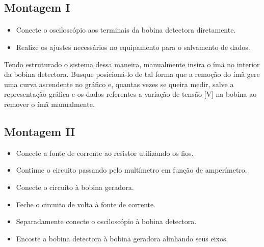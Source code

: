 \documentclass[column,brazilian,12pt,a4paper,final]{article}
\begin{document}
\subsection{Montagem I}
\paragraph{}
\begin{itemize}
\item Conecte o osciloscópio aos terminais da bobina detectora diretamente.\\

\item Realize os ajustes necessários no equipamento para o salvamento de dados.\\
\end{itemize}

Tendo estruturado o sistema dessa maneira, manualmente insira o ímã no interior da bobina detectora. Busque posicioná-lo de tal forma que a remoção do ímã gere uma curva ascendente no gráfico e, quantas vezes se queira medir, salve a representação gráfica e os dados referentes a variação de tensão [V] na bobina ao remover o ímã manualmente. 

\subsection{Montagem II}
\begin{itemize}
\item Conecte a fonte de corrente ao resistor utilizando os fios.\\

\item Continue o circuito passando pelo multímetro em função de amperímetro.\\

\item Conecte o circuito à bobina geradora.\\

\item Feche o circuito de volta à fonte de corrente.\\

\item Separadamente conecte o osciloscópio à bobina detectora.\\

\item Encoste a bobina detectora à bobina geradora alinhando seus eixos.\\
\end{itemize}
\end{document}
